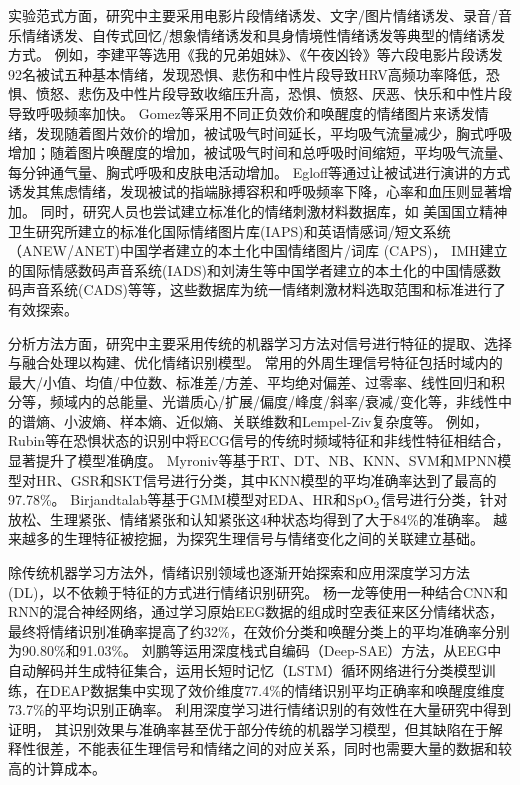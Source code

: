 实验范式方面，研究中主要采用电影片段情绪诱发、文字/图片情绪诱发、录音/音乐情绪诱发、自传式回忆/想象情绪诱发和具身情境性情绪诱发等典型的情绪诱发方式\cite{Mengzhaolan2005}。
例如，李建平等\cite{LiJianping2006}选用《我的兄弟姐妹》、《午夜凶铃》等六段电影片段诱发92名被试五种基本情绪，发现恐惧、悲伤和中性片段导致HRV高频功率降低，恐惧、愤怒、悲伤及中性片段导致收缩压升高，恐惧、愤怒、厌恶、快乐和中性片段导致呼吸频率加快。
Gomez等\cite{Gomez2004}采用不同正负效价和唤醒度的情绪图片来诱发情绪，发现随着图片效价的增加，被试吸气时间延长，平均吸气流量减少，胸式呼吸增加；随着图片唤醒度的增加，被试吸气时间和总呼吸时间缩短，平均吸气流量、每分钟通气量、胸式呼吸和皮肤电活动增加。
Egloff等\cite{Egloff2002}通过让被试进行演讲的方式诱发其焦虑情绪，发现被试的指端脉搏容积和呼吸频率下降，心率和血压则显著增加。
同时，研究人员也尝试建立标准化的情绪刺激材料数据库，如
美国国立精神卫生研究所建立的标准化国际情绪图片库(IAPS)和英语情感词/短文系统（ANEW/ANET)中国学者\cite{BaiLu2005}建立的本土化中国情绪图片/词库 (CAPS)，
IMH建立的国际情感数码声音系统(IADS)和刘涛生等中国学者\cite{LiuTaosheng2006}建立的本土化的中国情感数码声音系统(CADS)等等，这些数据库为统一情绪刺激材料选取范围和标准进行了有效探索。

分析方法方面，研究中主要采用传统的机器学习方法对信号进行特征的提取、选择与融合处理以构建、优化情绪识别模型。
常用的外周生理信号特征\cite{Bota2019}包括时域内的最大/小值、均值/中位数、标准差/方差、平均绝对偏差、过零率、线性回归和积分等，频域内的总能量、光谱质心/扩展/偏度/峰度/斜率/衰减/变化等，非线性中的谱熵、小波熵、样本熵、近似熵、关联维数和Lempel-Ziv复杂度等。
例如，Rubin等\cite{Rubin2016}在恐惧状态的识别中将ECG信号的传统时频域特征和非线性特征相结合，显著提升了模型准确度。
Myroniv等\cite{Myroniv2017}基于RT、DT、NB、KNN、SVM和MPNN模型对HR、GSR和SKT信号进行分类，其中KNN模型的平均准确率达到了最高的97.78\%。
Birjandtalab等\cite{Birjandtalab2016}基于GMM模型对EDA、HR和${\rm SpO}_{\rm 2}$信号进行分类，针对放松、生理紧张、情绪紧张和认知紧张这4种状态均得到了大于84\%的准确率。
越来越多的生理特征被挖掘，为探究生理信号与情绪变化之间的关联建立基础。

除传统机器学习方法外，情绪识别领域也逐渐开始探索和应用深度学习方法(DL)，以不依赖于特征的方式进行情绪识别研究。
杨一龙等\cite{YangYilong2018}使用一种结合CNN和RNN的混合神经网络，通过学习原始EEG数据的组成时空表征来区分情绪状态，最终将情绪识别准确率提高了约32\%，在效价分类和唤醒分类上的平均准确率分别为90.80\%和91.03\%。
刘鹏等\cite{刘鹏2021}运用深度栈式自编码（Deep-SAE）方法，从EEG中自动解码并生成特征集合，运用长短时记忆（LSTM）循环网络进行分类模型训练，在DEAP数据集中实现了效价维度77.4\%的情绪识别平均正确率和唤醒度维度73.7\%的平均识别正确率。
利用深度学习进行情绪识别的有效性在大量研究中得到证明，
其识别效果与准确率甚至优于部分传统的机器学习模型，但其缺陷在于解释性很差，不能表征生理信号和情绪之间的对应关系，同时也需要大量的数据和较高的计算成本。

